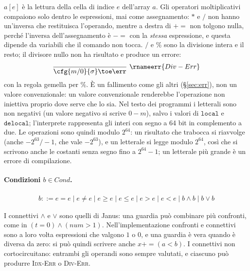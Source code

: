 \noindent
$a[e]$ è la lettura della cella di indice $e$ dell'array $a$. Gli operatori
moltiplicativi compaiono solo dentro le espressioni, mai come assegnamento:
$*$ e $/$ non hanno un'inversa che restituisca l'operando, mentre a destra di
$\mathbin{+\!\!=}$ non tolgono nulla, perché l'inversa dell'assegnamento è
$\mathbin{-\!\!=}$ con la \emph{stessa} espressione, e questa dipende da
variabili che il comando non tocca. $/$ e $\%$ sono la divisione intera e il
resto; il divisore nullo non ha risultato e produce un errore:
\[
\dfrac{}{\cfg{m / 0}{\sigma} \toe \err}\ \rnameerr{Div-Err}
\]
con la regola gemella per $\%$. È un fallimento come gli altri
(\S\ref{sec:err}), non un valore convenzionale: un valore convenzionale
renderebbe l'operazione non iniettiva proprio dove serve che lo sia.
Nel testo dei programmi i letterali sono non negativi (un valore negativo si
scrive $0 - m$), salvo i valori di $\mathtt{local}$ e $\mathtt{delocal}$;
l'interprete rappresenta gli interi con segno a 64 bit in complemento a due.
Le operazioni sono quindi modulo $2^{64}$: un risultato che trabocca si
riavvolge (anche $-2^{63} / -1$, che vale $-2^{63}$), e un letterale si legge
modulo $2^{64}$, così che si scrivono anche le costanti senza segno fino a
$2^{64}-1$; un letterale più grande è un errore di compilazione.

\paragraph{Condizioni $b \in \mathit{Cond}$.}
\begin{align*}
b ::= e = e \mid e \neq e \mid e \geq e \mid e \leq e \mid e > e \mid e < e
  \mid b \land b \mid b \lor b
\end{align*}

\noindent
I connettivi $\land$ e $\lor$ sono quelli di Janus: una guardia può combinare
più confronti, come in $(t = 0) \land (\mathit{num} > 1)$. Nell'implementazione confronti e connettivi sono a
loro volta espressioni che valgono $1$ o $0$, e una guardia è vera quando è
diversa da zero: si può quindi scrivere anche $x \mathbin{+\!\!=} (a < b)$. I
connettivi non cortocircuitano: entrambi gli operandi sono sempre valutati, e
ciascuno può produrre \textsc{Idx-Err} o \textsc{Div-Err}.

